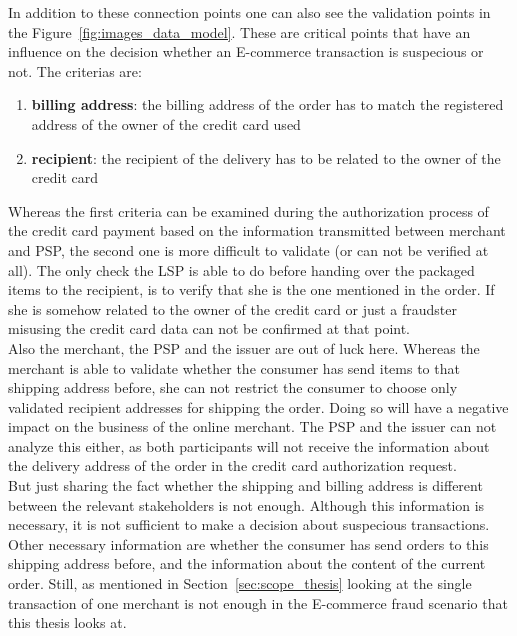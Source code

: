 In addition to these connection points one can also see the validation points in the Figure~\ref{fig:images_data_model}. These are critical points that have an influence on the decision whether an E-commerce transaction is suspecious or not. The criterias are: \@

\begin{enumerate}
  \item \textbf{billing address}: the billing address of the order has to match the registered address of the owner of the credit card used
  \item \textbf{recipient}: the recipient of the delivery has to be related to the owner of the credit card
\end{enumerate}

Whereas the first criteria can be examined during the authorization process of the credit card payment based on the information transmitted between merchant and \gls{PSP}, the second one is more difficult to validate (or can not be verified at all). The only check the \gls{LSP} is able to do before handing over the packaged items to the recipient, is to verify that she is the one mentioned in the order. If she is somehow related to the owner of the credit card or just a fraudster misusing the credit card data can not be confirmed at that point. \\

Also the merchant, the \gls{PSP} and the issuer are out of luck here. Whereas the merchant is able to validate whether the consumer has send items to that shipping address before, she can not restrict the consumer to choose only validated recipient addresses for shipping the order. Doing so will have a negative impact on the business of the online merchant. The \gls{PSP} and the issuer can not analyze this either, as both participants will not receive the information about the delivery address of the order in the credit card authorization request. \\

But just sharing the fact whether the shipping and billing address is different between the relevant stakeholders is not enough. Although this information is necessary, it is not sufficient to make a decision about suspecious transactions. Other necessary information are whether the consumer has send orders to this shipping address before, and the information about the content of the current order. Still, as mentioned in Section~\ref{sec:scope_thesis} looking at the single transaction of one merchant is not enough in the E-commerce fraud scenario that this thesis looks at. \\

